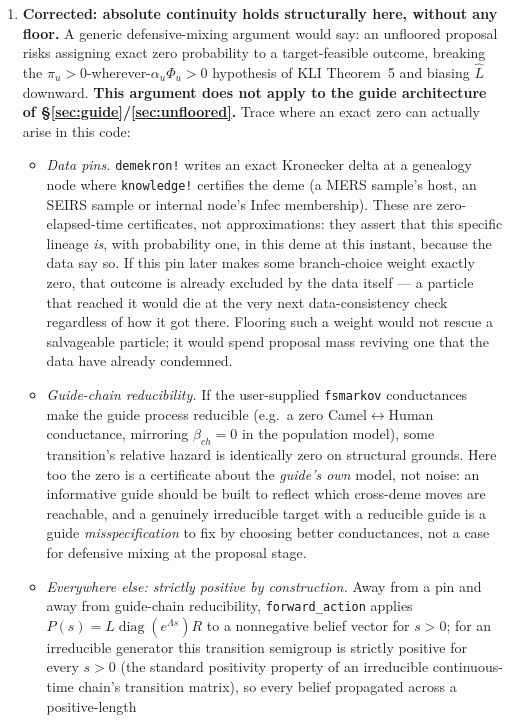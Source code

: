 \documentclass[11pt]{article}
\theoremstyle{plain}
\begin{document}
\begin{enumerate}
\item[(v)] \textbf{Corrected: absolute continuity holds structurally here, without any floor.} A
generic defensive-mixing argument would say: an unfloored proposal risks assigning exact zero
probability to a target-feasible outcome, breaking the $\pi_u>0$-wherever-$\alpha_u\Phi_u>0$
hypothesis of KLI Theorem~5 and biasing $\hat L$ downward. \textbf{This argument does not apply to
the guide architecture of \S\ref{sec:guide}/\ref{sec:unfloored}.} Trace where an exact zero can
actually arise in this code:
\begin{itemize}
\item \emph{Data pins.} \texttt{demekron!} writes an exact Kronecker delta at a genealogy node
where \texttt{knowledge!} certifies the deme (a MERS sample's host, an SEIRS sample or internal
node's Infec membership). These are zero-elapsed-time certificates, not approximations: they assert
that this specific lineage \emph{is}, with probability one, in this deme at this instant, because
the data say so. If this pin later makes some branch-choice weight exactly zero, that outcome is
already excluded by the data itself --- a particle that reached it would die at the very next
data-consistency check regardless of how it got there. Flooring such a weight would not rescue a
salvageable particle; it would spend proposal mass reviving one that the data have already
condemned.
\item \emph{Guide-chain reducibility.} If the user-supplied \texttt{fsmarkov} conductances make the
guide process reducible (e.g.\ a zero Camel$\leftrightarrow$Human conductance, mirroring
$\beta_{ch}=0$ in the population model), some transition's relative hazard is identically zero on
structural grounds. Here too the zero is a certificate about the \emph{guide's own} model, not
noise: an informative guide should be built to reflect which cross-deme moves are reachable, and a
genuinely irreducible target with a reducible guide is a guide \emph{misspecification} to fix by
choosing better conductances, not a case for defensive mixing at the proposal stage.
\item \emph{Everywhere else: strictly positive by construction.} Away from a pin and away from
guide-chain reducibility, \texttt{forward\_action} applies $P(s)=L\operatorname{diag}(e^{\Lambda
s})R$ to a nonnegative belief vector for $s>0$; for an irreducible generator this transition
semigroup is strictly positive for every $s>0$ (the standard positivity property of an irreducible
continuous-time chain's transition matrix), so every belief propagated across a positive-length

\end{itemize}
\end{enumerate}
\end{document}
